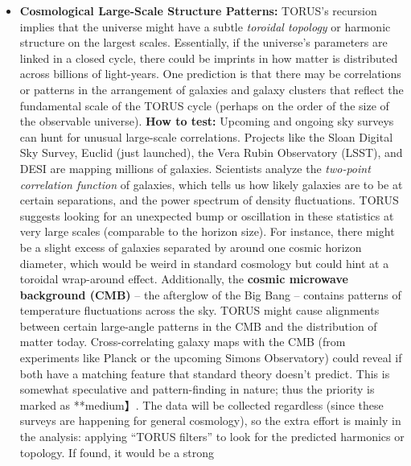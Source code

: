 \documentclass[
]{article}
\begin{document}
{\begin{itemize}
  parameter related to observer influence (or cast doubt on the OSQN
  idea entirely). Either way, this is a fascinating frontier where
  quantum foundations and TORUS intersect.
\item
  \textbf{Cosmological Large-Scale Structure Patterns:} TORUS's
  recursion implies that the universe might have a subtle \emph{toroidal
  topology} or harmonic structure on the largest scales. Essentially, if
  the universe's parameters are linked in a closed cycle, there could be
  imprints in how matter is distributed across billions of light-years.
  One prediction is that there may be correlations or patterns in the
  arrangement of galaxies and galaxy clusters that reflect the
  fundamental scale of the TORUS cycle (perhaps on the order of the size
  of the observable universe). \textbf{How to test:} Upcoming and
  ongoing sky surveys can hunt for unusual large-scale correlations.
  Projects like the Sloan Digital Sky Survey, Euclid (just launched),
  the Vera Rubin Observatory (LSST), and DESI are mapping millions of
  galaxies. Scientists analyze the \emph{two-point correlation function}
  of galaxies, which tells us how likely galaxies are to be at certain
  separations, and the power spectrum of density fluctuations. TORUS
  suggests looking for an unexpected bump or oscillation in these
  statistics at very large scales (comparable to the horizon
  size)\hspace{0pt}. For instance, there might be a slight excess of
  galaxies separated by around one cosmic horizon diameter, which would
  be weird in standard cosmology but could hint at a toroidal
  wrap-around effect. Additionally, the \textbf{cosmic microwave
  background (CMB)} -- the afterglow of the Big Bang -- contains
  patterns of temperature fluctuations across the sky. TORUS might cause
  alignments between certain large-angle patterns in the CMB and the
  distribution of matter today\hspace{0pt}. Cross-correlating galaxy
  maps with the CMB (from experiments like Planck or the upcoming Simons
  Observatory) could reveal if both have a matching feature that
  standard theory doesn't predict\hspace{0pt}. This is somewhat
  speculative and pattern-finding in nature; thus the priority is marked
  as **medium】. The data will be collected regardless (since these
  surveys are happening for general cosmology), so the extra effort is
  mainly in the analysis: applying ``TORUS filters'' to look for the
  predicted harmonics or topology. If found, it would be a strong

\end{itemize}}
\end{document}
